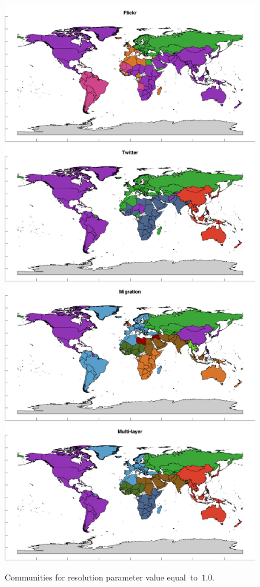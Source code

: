 \documentclass[aps,superscriptaddress,showkeys,nofootinbib]{revtex4-1}
\begin{document}
\begin{figure}[t!]
\centering
\includegraphics[width=.49\textwidth]{partitioning_Flickr_a=10.png}
\includegraphics[width=.49\textwidth]{partitioning_Twitter_a=10.png}
\includegraphics[width=.49\textwidth]{partitioning_Migration_a=10.png}
\includegraphics[width=.49\textwidth]{partitioning_Multi-layer_a=10.png}
\caption{\label{fig::partitioning10}Communities for resolution parameter value equal~to~$1.0$.}
\end{figure}
\end{document}
